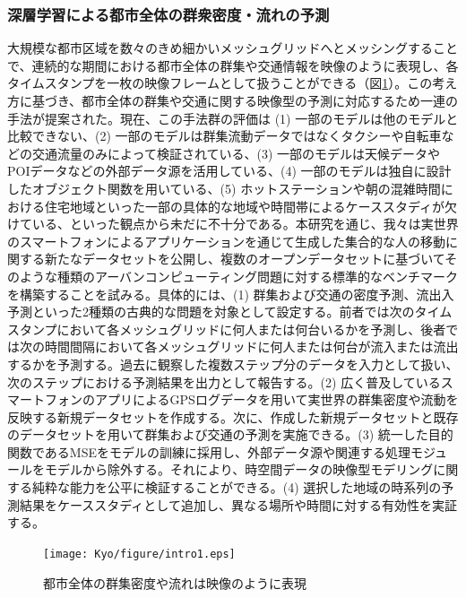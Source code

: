 \subsubsection{深層学習による都市全体の群衆密度・流れの予測}
大規模な都市区域を数々のきめ細かいメッシュグリッドへとメッシングすることで、連続的な期間における都市全体の群集や交通情報を映像のように表現し、各タイムスタンプを一枚の映像フレームとして扱うことができる（図\ref{fig:intro1_jiang}）。この考え方に基づき、都市全体の群集や交通に関する映像型の予測に対応するため一連の手法が提案された。現在、この手法群の評価は (1) 一部のモデルは他のモデルと比較できない、(2) 一部のモデルは群集流動データではなくタクシーや自転車などの交通流量のみによって検証されている、(3) 一部のモデルは天候データやPOIデータなどの外部データ源を活用している、(4) 一部のモデルは独自に設計したオブジェクト関数を用いている、(5) ホットステーションや朝の混雑時間における住宅地域といった一部の具体的な地域や時間帯によるケーススタディが欠けている、といった観点から未だに不十分である。本研究を通じ、我々は実世界のスマートフォンによるアプリケーションを通じて生成した集合的な人の移動に関する新たなデータセットを公開し、複数のオープンデータセットに基づいてそのような種類のアーバンコンピューティング問題に対する標準的なベンチマークを構築することを試みる。具体的には、(1) 群集および交通の密度予測、流出入予測といった2種類の古典的な問題を対象として設定する。前者では次のタイムスタンプにおいて各メッシュグリッドに何人または何台いるかを予測し、後者では次の時間間隔において各メッシュグリッドに何人または何台が流入または流出するかを予測する。過去に観察した複数ステップ分のデータを入力として扱い、次のステップにおける予測結果を出力として報告する。(2) 広く普及しているスマートフォンのアプリによるGPSログデータを用いて実世界の群集密度や流動を反映する新規データセットを作成する。次に、作成した新規データセットと既存のデータセットを用いて群集および交通の予測を実施できる。(3) 統一した目的関数であるMSEをモデルの訓練に採用し、外部データ源や関連する処理モジュールをモデルから除外する。それにより、時空間データの映像型モデリングに関する純粋な能力を公平に検証することができる。(4) 選択した地域の時系列の予測結果をケーススタディとして追加し、異なる場所や時間に対する有効性を実証する。
\begin{figure}[h]
	\centering	
	\texttt{[image: Kyo/figure/intro1.eps]}
	\caption{都市全体の群集密度や流れは映像のように表現}
	\label{fig:intro1_jiang}
\end{figure}

